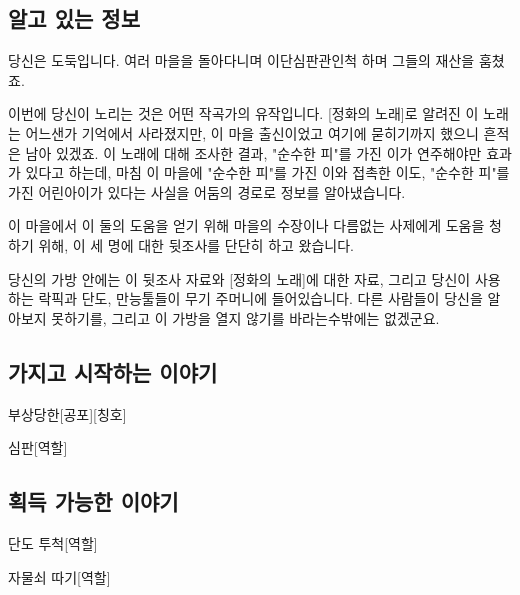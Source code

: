 \documentclass{report}
\begin{document}
	\subsection*{알고 있는 정보}
		당신은 도둑입니다. 여러 마을을 돌아다니며 이단심판관인척 하며 그들의 재산을 훔쳤죠.
		
		이번에 당신이 노리는 것은 어떤 작곡가의 유작입니다. [정화의 노래]로 알려진 이 노래는 어느샌가 기억에서 사라졌지만, 이 마을 출신이었고 여기에 묻히기까지 했으니 흔적은 남아 있겠죠. 이 노래에 대해 조사한 결과, "순수한 피"를 가진 이가 연주해야만 효과가 있다고 하는데, 마침 이 마을에 "순수한 피"를 가진 이와 접촉한 이도, "순수한 피"를 가진 어린아이가 있다는 사실을 어둠의 경로로 정보를 알아냈습니다.
		
		이 마을에서 이 둘의 도움을 얻기 위해 마을의 수장이나 다름없는 사제에게 도움을 청하기 위해, 이 세 명에 대한 뒷조사를 단단히 하고 왔습니다.
		
		당신의 가방 안에는 이 뒷조사 자료와 [정화의 노래]에 대한 자료, 그리고 당신이 사용하는 락픽과 단도, 만능툴들이 무기 주머니에 들어있습니다. 다른 사람들이 당신을 알아보지 못하기를, 그리고 이 가방을 열지 않기를 바라는수밖에는 없겠군요.
	
	\subsection*{가지고 시작하는 이야기}
		\begin{spoiler}{부상당한}{[공포][칭호]}
			
		\end{spoiler}
		
		\begin{spoiler}{심판}{[역할]}
		\end{spoiler}
	
	\subsection*{획득 가능한 이야기}
		\begin{spoiler}{단도 투척}{[역할]}
			
		\end{spoiler}
		
		\begin{spoiler}{자물쇠 따기}{[역할]}
			
		\end{spoiler}
\end{document}
